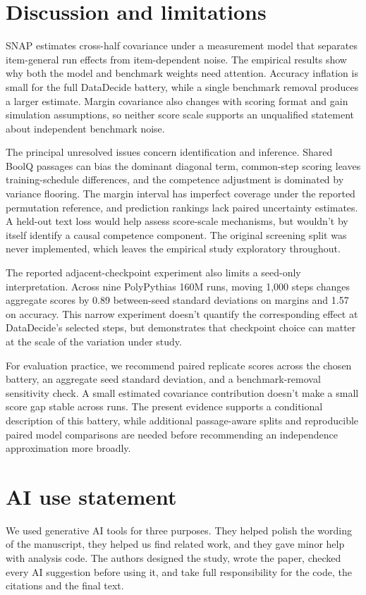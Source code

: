 \documentclass{article}
\begin{document}
\section{Discussion and limitations}
SNAP estimates cross-half covariance under a measurement model that separates item-general run effects from item-dependent noise. The empirical results show why both the model and benchmark weights need attention. Accuracy inflation is small for the full DataDecide battery, while a single benchmark removal produces a larger estimate. Margin covariance also changes with scoring format and gain simulation assumptions, so neither score scale supports an unqualified statement about independent benchmark noise.

The principal unresolved issues concern identification and inference. Shared BoolQ passages can bias the dominant diagonal term, common-step scoring leaves training-schedule differences, and the competence adjustment is dominated by variance flooring. The margin interval has imperfect coverage under the reported permutation reference, and prediction rankings lack paired uncertainty estimates. A held-out text loss would help assess score-scale mechanisms, but wouldn't by itself identify a causal competence component. The original screening split was never implemented, which leaves the empirical study exploratory throughout.

The reported adjacent-checkpoint experiment also limits a seed-only interpretation. Across nine PolyPythias 160M runs, moving 1,000 steps changes aggregate scores by 0.89 between-seed standard deviations on margins and 1.57 on accuracy. This narrow experiment doesn't quantify the corresponding effect at DataDecide's selected steps, but demonstrates that checkpoint choice can matter at the scale of the variation under study.

For evaluation practice, we recommend paired replicate scores across the chosen battery, an aggregate seed standard deviation, and a benchmark-removal sensitivity check. A small estimated covariance contribution doesn't make a small score gap stable across runs. The present evidence supports a conditional description of this battery, while additional passage-aware splits and reproducible paired model comparisons are needed before recommending an independence approximation more broadly.

\label{maintext:end}
\section*{AI use statement}
We used generative AI tools for three purposes. They helped polish the wording of the manuscript, they helped us find related work, and they gave minor help with analysis code. The authors designed the study, wrote the paper, checked every AI suggestion before using it, and take full responsibility for the code, the citations and the final text.
\end{document}
